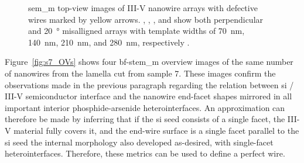 \begin{figure}
{    }
    \caption[\acs{sem_m} images of nanowire arrays.]{\acs{sem_m} top-view images of III-V nanowire arrays with defective wires marked by yellow arrows. , , , and  show both perpendicular and \qty{20}{\degree} misalligned arrays with template widths of \qty{70}{nm}, \qty{140}{nm}, \qty{210}{nm}, and \qty{280}{nm}, respectively \cite{Brugnolotto2023_2}.}
    \label{fig:s7_arrays}
\end{figure}

Figure~\ref{fig:s7_OVs} shows four \acs{bf}-\acs{stem_m} overview images of the same number of nanowires from the lamella cut from sample 7. These images confirm the observations made in the previous paragraph regarding the relation between \acf{si} / III-V semiconductor interface and the nanowire end-facet shapes mirrored in all important interior phosphide-arsenide heterointerfaces. An approximation can therefore be made by inferring that if the \acl{si} seed consists of a single  facet, the III-V material fully covers it, and the end-wire surface is a single  facet parallel to the \acs{si} seed the internal morphology also developed as-desired, with  single-facet heterointerfaces. Therefore, these metrics can be used to define a perfect wire.

